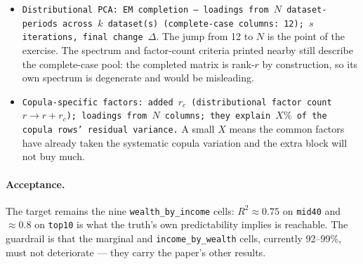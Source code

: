 \documentclass[11pt]{article}
\newcommand{\code}[1]{\texttt{#1}}
\begin{document}
\begin{itemize}[leftmargin=*]
  \item \code{Distributional PCA: EM completion --- loadings from $N$
        dataset-periods across $k$ dataset(s) (complete-case columns: 12); $s$
        iterations, final change $\Delta$}. The jump from 12 to $N$ is the point
        of the exercise. The spectrum and factor-count criteria printed nearby
        still describe the complete-case pool: the completed matrix is rank-$r$
        by construction, so its own spectrum is degenerate and would be
        misleading.
  \item \code{Copula-specific factors: added $r_c$ (distributional factor count
        $r \to r + r_c$); loadings from $N$ columns; they explain $X\%$ of the
        copula rows' residual variance.} A small $X$ means the common factors
        have already taken the systematic copula variation and the extra block
        will not buy much.
\end{itemize}

\paragraph{Acceptance.} The target remains the nine \code{wealth\_by\_income}
cells: $R^2 \approx 0.75$ on \code{mid40} and $\approx 0.8$ on \code{top10} is
what the truth's own predictability implies is reachable. The guardrail is that
the marginal and \code{income\_by\_wealth} cells, currently 92--99\%, must not
deteriorate --- they carry the paper's other results.
\end{document}
